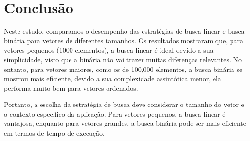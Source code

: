 \section{Conclusão}

Neste estudo, comparamos o desempenho das estratégias de busca linear e busca binária para 
vetores de diferentes tamanhos. Os resultados mostraram que, para vetores pequenos (1000 elementos), 
a busca linear é ideal devido a sua simplicidade, visto que a binária não vai trazer muitas diferenças relevantes. 
No entanto, para vetores maiores, como os de 100,000 elementos, a busca binária se mostrou mais eficiente, 
devido a sua complexidade assintótica menor, ela performa muito bem para vetores ordenados.

Portanto, a escolha da estratégia de busca deve considerar o tamanho do vetor e o contexto 
específico da aplicação. Para vetores pequenos, a busca linear é vantajosa, enquanto para vetores 
grandes, a busca binária pode ser mais eficiente em termos de tempo de execução.
